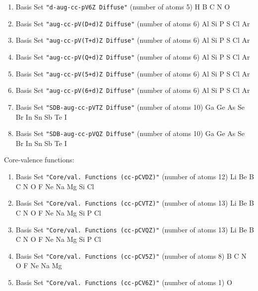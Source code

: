 \begin{enumerate}
\item Basis Set \verb#"d-aug-cc-pV6Z Diffuse"# (number of atoms 5)  \newline
  H B C N O

\item Basis Set \verb#"aug-cc-pV(D+d)Z Diffuse"# (number of atoms 6)  \newline
  Al Si P S Cl Ar


\item Basis Set \verb#"aug-cc-pV(T+d)Z Diffuse"# (number of atoms 6)  \newline
  Al Si P S Cl Ar


\item Basis Set \verb#"aug-cc-pV(Q+d)Z Diffuse"# (number of atoms 6)  \newline
  Al Si P S Cl Ar


\item Basis Set \verb#"aug-cc-pV(5+d)Z Diffuse"# (number of atoms 6)  \newline
  Al Si P S Cl Ar


\item Basis Set \verb#"aug-cc-pV(6+d)Z Diffuse"# (number of atoms 6)  \newline
  Al Si P S Cl Ar


\item Basis Set \verb#"SDB-aug-cc-pVTZ Diffuse"# (number of atoms 10)  \newline
  Ga Ge As Se Br In Sn Sb Te I


\item Basis Set \verb#"SDB-aug-cc-pVQZ Diffuse"# (number of atoms 10)  \newline
  Ga Ge As Se Br In Sn Sb Te I

\end{enumerate}

Core-valence functions:

\begin{enumerate}

\item Basis Set \verb#"Core/val. Functions (cc-pCVDZ)"# (number of atoms 12)  \newline
  Li Be B C N O F Ne Na Mg Si Cl


\item Basis Set \verb#"Core/val. Functions (cc-pCVTZ)"# (number of atoms 13)  \newline
  Li Be B C N O F Ne Na Mg Si P Cl


\item Basis Set \verb#"Core/val. Functions (cc-pCVQZ)"# (number of atoms 13)  \newline
  Li Be B C N O F Ne Na Mg Si P Cl


\item Basis Set \verb#"Core/val. Functions (cc-pCV5Z)"# (number of atoms 8)  \newline
  B C N O F Ne Na Mg


\item Basis Set \verb#"Core/val. Functions (cc-pCV6Z)"# (number of atoms 1)  \newline
  O

\end{enumerate}

\fussy


